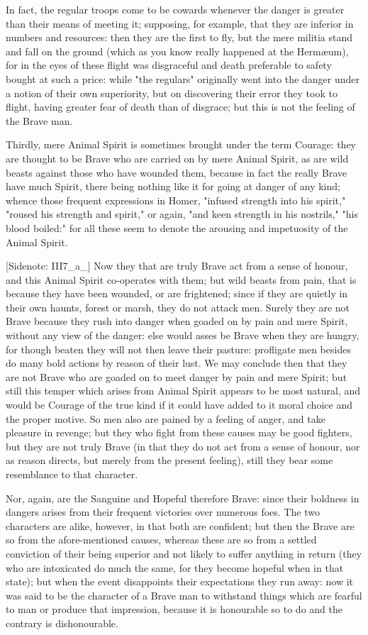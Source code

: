 In fact, the regular troops come to be cowards whenever the danger is
greater than their means of meeting it; supposing, for example, that
they are inferior in numbers and resources: then they are the first to
fly, but the mere militia stand and fall on the ground (which as you
know really happened at the Hermæum), for in the eyes of these flight
was disgraceful and death preferable to safety bought at such a price:
while "the regulars" originally went into the danger under a notion
of their own superiority, but on discovering their error they took to
flight, having greater fear of death than of disgrace; but this is not
the feeling of the Brave man.

Thirdly, mere Animal Spirit is sometimes brought under the term Courage:
they are thought to be Brave who are carried on by mere Animal Spirit,
as are wild beasts against those who have wounded them, because in fact
the really Brave have much Spirit, there being nothing like it for going
at danger of any kind; whence those frequent expressions in Homer,
"infused strength into his spirit," "roused his strength and spirit," or
again, "and keen strength in his nostrils," "his blood boiled:" for all
these seem to denote the arousing and impetuosity of the Animal Spirit.

[Sidenote: III7_a_] Now they that are truly Brave act from a sense of
honour, and this Animal Spirit co-operates with them; but wild beasts
from pain, that is because they have been wounded, or are frightened;
since if they are quietly in their own haunts, forest or marsh, they do
not attack men. Surely they are not Brave because they rush into danger
when goaded on by pain and mere Spirit, without any view of the danger:
else would asses be Brave when they are hungry, for though beaten they
will not then leave their pasture: profligate men besides do many bold
actions by reason of their lust. We may conclude then that they are not
Brave who are goaded on to meet danger by pain and mere Spirit; but
still this temper which arises from Animal Spirit appears to be most
natural, and would be Courage of the true kind if it could have added
to it moral choice and the proper motive. So men also are pained by a
feeling of anger, and take pleasure in revenge; but they who fight from
these causes may be good fighters, but they are not truly Brave (in
that they do not act from a sense of honour, nor as reason directs, but
merely from the present feeling), still they bear some resemblance to
that character.

Nor, again, are the Sanguine and Hopeful therefore Brave: since their
boldness in dangers arises from their frequent victories over numerous
foes. The two characters are alike, however, in that both are confident;
but then the Brave are so from the afore-mentioned causes, whereas these
are so from a settled conviction of their being superior and not likely
to suffer anything in return (they who are intoxicated do much the
same, for they become hopeful when in that state); but when the event
disappoints their expectations they run away: now it was said to be the
character of a Brave man to withstand things which are fearful to man
or produce that impression, because it is honourable so to do and the
contrary is dishonourable.

